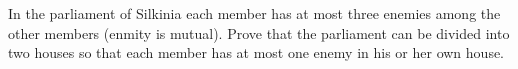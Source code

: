 In the parliament of Silkinia each member has at most three enemies among the other members (enmity is mutual). Prove that the parliament can be divided into two houses so that each member has at most one enemy in his or her own house.
